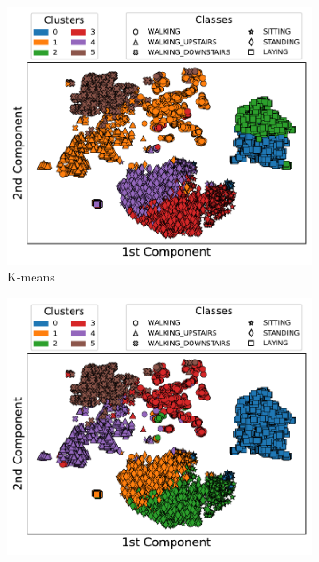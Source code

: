 \documentclass[10pt, a4paper, twocolumn]{article}
\begin{document}
\begin{figure}[t]
\centering

    \begin{subfigure}[t]{0.196\textwidth}
        \includegraphics[width=\linewidth]{immagini simone/kmeans_scatter.pdf}
        \caption{K-means}
        \label{fig:kmeans_scatter}
    \end{subfigure}
    \begin{subfigure}[t]{0.196\textwidth}
        \includegraphics[width=\linewidth]{immagini simone/bisecting_scatter.pdf}

\end{subfigure}
\end{figure}
\end{document}
